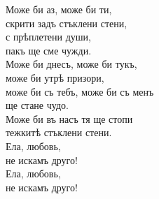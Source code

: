\documentclass{article}
\begin{document}
 Може би аз, може би ти, \\
 скрити задъ стъклени стени, \\
 с прѣплетени души, \\
 пакъ ще сме чужди. \\
 
 Може би днесъ, може би тукъ, \\
 може би утрѣ призори, \\
 може би съ тебъ, може би съ менъ \\
 ще стане чудо. \\
 
 Може би въ насъ тя ще стопи \\
 тежкитѣ стъклени стени. \\
 Ела, любовь, \\
 не искамъ друго! \\
 
 Ела, любовь,  \\
 не искамъ друго! \\
\end{document}
